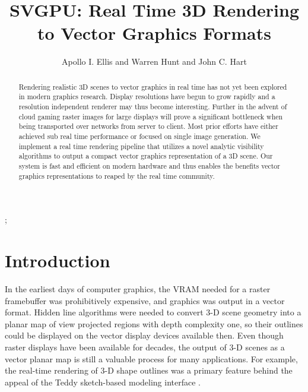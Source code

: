 \documentclass[review]{acmsiggraph}
\title{SVGPU: Real Time 3D Rendering to Vector Graphics Formats}
\author{Apollo I. Ellis and Warren Hunt and John C. Hart}
\begin{document}

 \teaser{
 }

\maketitle

\begin{abstract}

Rendering realistic 3D scenes to vector graphics in real time has not yet been explored in modern graphics research. Display resolutions have begun to grow rapidly and a resolution independent renderer may thus become interesting. Further in the advent of cloud gaming raster images for large displays will prove a significant bottleneck when being transported over networks from server to client.  Most prior efforts have either achieved sub real time performance or focused on single image generation. We implement a real time rendering pipeline that utilizes a novel analytic visibility algorithms to output a compact vector graphics representation of a 3D scene. Our system is fast and efficient on modern hardware and thus enables the benefits vector graphics representations to reaped by the real time community.

\end{abstract}

\begin{CRcatlist}
  ;
\end{CRcatlist}

\keywordlist


\copyrightspace

\section{Introduction}
In the earliest days of computer graphics, the VRAM needed for a raster
framebuffer was prohibitively expensive, and graphics was output in a vector
format. Hidden line algorithms were needed to convert 3-D scene geometry into
a planar map of view projected regions with depth complexity one, so their
outlines could be displayed on the vector display devices available then. Even
though raster displays have been available for decades, the output of 3-D
scenes as a vector planar map is still a valuable process for many
applications. For example, the real-time rendering of 3-D shape outlines was a
primary feature behind the appeal of the Teddy sketch-based modeling interface
\cite{igarashi1999}.
\end{document}
